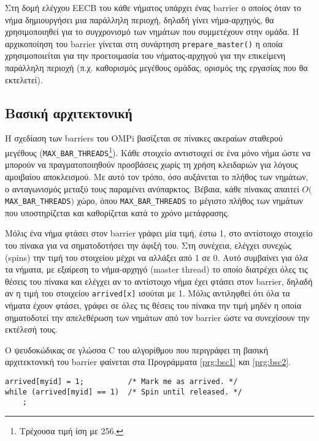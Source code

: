 Στη δομή ελέγχου EECB του κάθε νήματος υπάρχει ένας barrier ο οποίος όταν το νήμα δημιουργήσει μια παράλληλη περιοχή, δηλαδή γίνει νήμα-αρχηγός, θα χρησιμοποιηθεί για το συγχρονισμό των νημάτων που συμμετέχουν στην ομάδα. Η αρχικοποίηση του barrier γίνεται στη συνάρτηση \texttt{prepare\_master()} η οποία χρησιμοποιείται για την προετοιμασία του νήματος-αρχηγού για την επικείμενη παράλληλη περιοχή (π.χ. καθορισμός μεγέθους ομάδας, ορισμός της εργασίας που θα εκτελετεί).


\subsection{Βασική αρχιτεκτονική}
\label{ssec:Basic barrier architecture}
Η σχεδίαση των barriers του OMPi βασίζεται σε πίνακες ακεραίων σταθερού μεγέθους (\texttt{MAX\_BAR\_THREADS}\footnote{Τρέχουσα τιμή ίση με 256.}). Κάθε στοιχείο αντιστοιχεί σε ένα μόνο νήμα ώστε να μπορούν να πραγματοποιηθούν προσβάσεις χωρίς τη χρήση κλειδαριών για λόγους αμοιβαίου αποκλεισμού. Με αυτό τον τρόπο, όσο αυξάνεται το πλήθος των νημάτων, ο ανταγωνισμός μεταξύ τους παραμένει ανύπαρκτος. Βέβαια, κάθε πίνακας απαιτεί $O($\texttt{MAX\_BAR\_THREADS}$)$ χώρο, όπου \texttt{MAX\_BAR\_THREADS} το μέγιστο πλήθος των νημάτων που υποστηρίζεται και καθορίζεται κατά το χρόνο μετάφρασης.

Μόλις ένα νήμα φτάσει στον barrier γράφει μία τιμή, έστω 1, στο αντίστοιχο στοιχείο του πίνακα για να σηματοδοτήσει την άφιξή του. Στη συνέχεια, ελέγχει συνεχώς (spins) την τιμή του στοιχείου μέχρι να αλλάξει από 1 σε 0. Αυτό συμβαίνει για όλα τα νήματα, με εξαίρεση το νήμα-αρχηγό (master thread) το οποίο διατρέχει όλες τις θέσεις του πίνακα και ελέγχει αν το αντίστοιχο νήμα έχει φτάσει στον barrier, δηλαδή αν η τιμή του στοιχείου \texttt{arrived[x]} ισούται με 1. Μόλις αντιληφθεί ότι όλα τα νήματα έχουν φτάσει, γράφει σε όλες τις θέσεις του πίνακα την τιμή μηδέν η οποία σηματοδοτεί την απελεθέρωση των νημάτων από τον barrier ώστε να συνεχίσουν την εκτέλεσή τους.

Ο ψευδοκώδικας σε γλώσσα C του αλγορίθμου που περιγράφει τη βασική αρχιτεκτονική του barrier φαίνεται στα Προγράμματα \ref{prg:bsc1} και \ref{prg:bsc2}.

\begin{lstlisting}[label=prg:bsc1, caption=Απλός barrier για όλα τα νήματα πλην του νήματος-αρχηγού.]
arrived[myid] = 1;          /* Mark me as arrived. */
while (arrived[myid] == 1)  /* Spin until released. */
    ;
\end{lstlisting}

